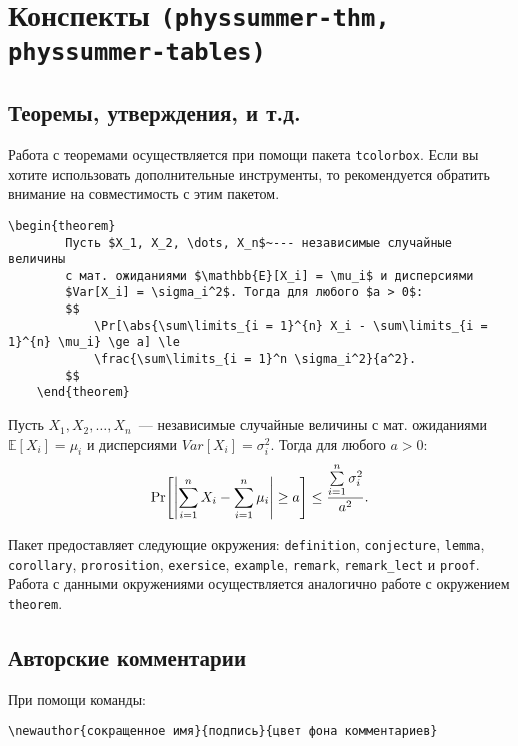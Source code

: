 \section{Конспекты \texttt{(physsummer-thm, physsummer-tables)}}

\subsection{Теоремы, утверждения, и т.д.}

Работа с теоремами осуществляется при помощи пакета \texttt{tcolorbox}. Если вы хотите использовать
дополнительные инструменты, то рекомендуется обратить внимание на совместимость с этим пакетом.

\begin{lstlisting}[gobble = 3]
    \begin{theorem}
        Пусть $X_1, X_2, \dots, X_n$~--- независимые случайные величины
        с мат. ожиданиями $\mathbb{E}[X_i] = \mu_i$ и дисперсиями
        $Var[X_i] = \sigma_i^2$. Тогда для любого $a > 0$:
        $$
            \Pr[\abs{\sum\limits_{i = 1}^{n} X_i - \sum\limits_{i = 1}^{n} \mu_i} \ge a] \le 
            \frac{\sum\limits_{i = 1}^n \sigma_i^2}{a^2}.
        $$
    \end{theorem}
\end{lstlisting}

\begin{theorem}
    Пусть $X_1, X_2, \dots, X_n$~--- независимые случайные величины с мат. ожиданиями $\mathbb{E}[X_i] =
    \mu_i$ и дисперсиями $Var[X_i] = \sigma_i^2$. Тогда для любого $a > 0$:
    $$
        \Pr[\abs{\sum\limits_{i = 1}^{n} X_i - \sum\limits_{i = 1}^{n} \mu_i} \ge a] \le
        \frac{\sum\limits_{i = 1}^n \sigma_i^2}{a^2}.
    $$
\end{theorem}

Пакет предоставляет следующие окружения: \texttt{definition}, \texttt{conjecture}, \texttt{lemma},
\texttt{corollary}, \texttt{prorosition}, \texttt{exersice}, \texttt{example}, \texttt{remark},
\texttt{remark\_lect} и \texttt{proof}. Работа с данными окружениями осуществляется аналогично работе с
окружением \texttt{theorem}.


\subsection{Авторские комментарии}
\label{sec:authors}

При помощи команды:
\begin{lstlisting}[gobble = 3]
    \newauthor{сокращенное имя}{подпись}{цвет фона комментариев}
\end{lstlisting}

